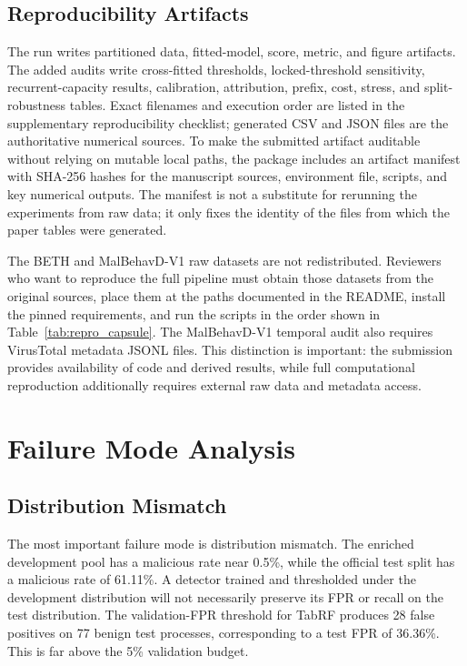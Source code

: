 \documentclass[10pt,journal,compsoc]{IEEEtran}
\begin{document}
\subsection{Reproducibility Artifacts}

The run writes partitioned data, fitted-model, score, metric, and figure artifacts. The added audits write cross-fitted thresholds, locked-threshold sensitivity, recurrent-capacity results, calibration, attribution, prefix, cost, stress, and split-robustness tables. Exact filenames and execution order are listed in the supplementary reproducibility checklist; generated CSV and JSON files are the authoritative numerical sources. To make the submitted artifact auditable without relying on mutable local paths, the package includes an artifact manifest with SHA-256 hashes for the manuscript sources, environment file, scripts, and key numerical outputs. The manifest is not a substitute for rerunning the experiments from raw data; it only fixes the identity of the files from which the paper tables were generated.

The BETH and MalBehavD-V1 raw datasets are not redistributed. Reviewers who want to reproduce the full pipeline must obtain those datasets from the original sources, place them at the paths documented in the README, install the pinned requirements, and run the scripts in the order shown in Table~\ref{tab:repro_capsule}. The MalBehavD-V1 temporal audit also requires VirusTotal metadata JSONL files. This distinction is important: the submission provides availability of code and derived results, while full computational reproduction additionally requires external raw data and metadata access.

\section{Failure Mode Analysis}
\label{sec:failure}

\subsection{Distribution Mismatch}

The most important failure mode is distribution mismatch. The enriched development pool has a malicious rate near 0.5\%, while the official test split has a malicious rate of 61.11\%. A detector trained and thresholded under the development distribution will not necessarily preserve its FPR or recall on the test distribution. The validation-FPR threshold for TabRF produces 28 false positives on 77 benign test processes, corresponding to a test FPR of 36.36\%. This is far above the 5\% validation budget.
\end{document}
